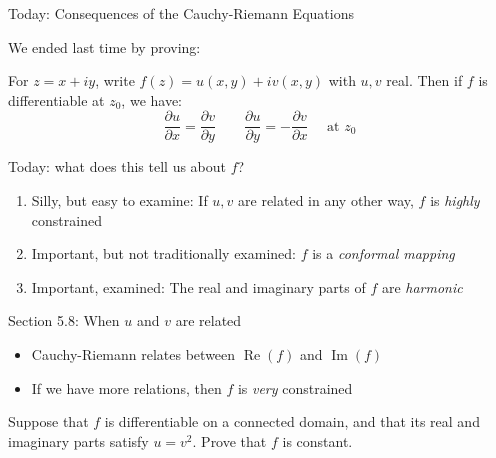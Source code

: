 \documentclass{beamer}
\DeclareMathOperator{\Real}{Re}
\DeclareMathOperator{\Imag}{Im}
\begin{document}
\begin{frame}{Today: Consequences of the Cauchy-Riemann Equations}

We ended last time by proving:  
\begin{theorem}
  For $z=x+iy$, write $f(z)=u(x,y)+iv(x,y)$ with $u,v$ real.  Then if $f$ is differentiable at $z_0$, we have:
  $$\frac{\partial u}{\partial x}=\frac{\partial v}{\partial y}\quad\quad\frac{\partial u}{\partial y}=-\frac{\partial v}{\partial x}\quad \text{ at } z_0$$
\end{theorem}

\begin{block}{Today: what does this tell us about $f$?}
  \begin{enumerate}
  \item Silly, but easy to examine: If $u,v$ are related in any other way, $f$ is \emph{highly} constrained
  \item Important, but not traditionally examined: $f$ is a \emph{conformal mapping}
  \item Important, examined: The real and imaginary parts of $f$ are \emph{harmonic}
  \end{enumerate}   


  \end{block}

\end{frame}

\begin{frame}{Section 5.8: When $u$ and $v$ are related}

\begin{itemize}
    \item Cauchy-Riemann relates between $\Real(f)$ and $\Imag(f)$
    \item If we have more relations, then $f$ is \emph{very} constrained
\end{itemize}


\begin{example}
Suppose that $f$ is differentiable on a connected domain, and that its real and imaginary parts satisfy $u=v^2$.  Prove that $f$ is constant.

  \end{example}

\end{frame}
\end{document}
